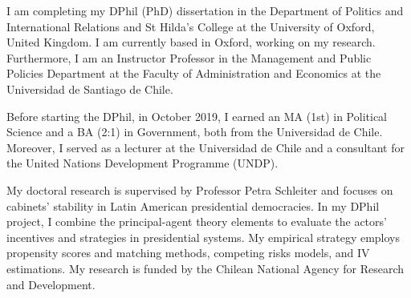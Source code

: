 




\vspace{3mm}

\begin{cvparagraph}

I am completing my DPhil (PhD) dissertation in the Department of Politics and International Relations and St Hilda’s College at the University of Oxford, United Kingdom. I am currently based in Oxford, working on my research. Furthermore, I am an Instructor Professor in the Management and Public Policies Department at the Faculty of Administration and Economics at the Universidad de Santiago de Chile.

Before starting the DPhil, in October 2019, I earned an MA (1st) in Political Science and a BA (2:1) in Government, both from the Universidad de Chile. Moreover, I served as a lecturer at the Universidad de Chile and a consultant for the United Nations Development Programme (UNDP).

My doctoral research is supervised by Professor Petra Schleiter and focuses on cabinets’ stability in Latin American presidential democracies. In my DPhil project, I combine the principal-agent theory elements to evaluate the actors’ incentives and strategies in presidential systems. My empirical strategy employs propensity scores and matching methods, competing risks models, and IV estimations. My research is funded by the Chilean National Agency for Research and Development.
\vspace{1mm}
\end{cvparagraph}
